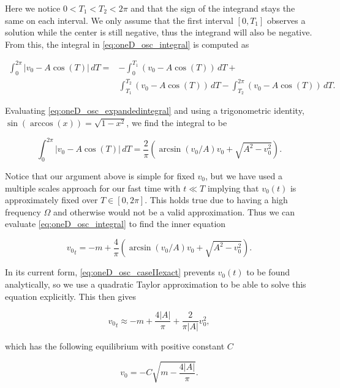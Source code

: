 Here we notice $0<T_1<T_2<2\pi$ and that the sign of the integrand stays the same on each interval. We only assume that the first interval $[0,T_1]$  observes a solution while the center is still negative, thus the integrand will also be negative. From this, the integral in \eqref{eq:oneD_osc_integral} is computed as

\begin{equation}\label{eq:oneD_osc_expandedintegral}
\begin{aligned}
\int_0^{2\pi}|v_0-A\cos(T)|\,dT=&-\int_0^{T_1}(v_0-A\cos(T))\,dT+\\
&\int_{T_1}^{T_2}(v_0-A\cos(T))\,dT-\int_{T_2}^{2\pi}(v_0-A\cos(T))\,dT.
\end{aligned}
\end{equation}

Evaluating \eqref{eq:oneD_osc_expandedintegral} and using a trigonometric identity, $\sin(\arccos(x))=\sqrt{1-x^2}$, we find the integral to be

\begin{equation*}
\int_0^{2\pi}|v_0-A\cos(T)|\,dT=\frac{2}{\pi}\left(\arcsin(v_0/A)v_0+\sqrt{A^2-v_0^2}\right).
\end{equation*}

Notice that our argument above is simple for fixed $v_0$, but we have used a multiple scales approach for our fast time with $t\ll T$ implying that $v_0(t)$ is approximately fixed over $T\in [0,2\pi]$. This holds true due to having a high frequency $\Omega$ and otherwise would not be a valid approximation. Thus we can evaluate \eqref{eq:oneD_osc_integral} to find the inner equation 

\begin{equation}\label{eq:oneD_osc_caseIIexact}
{v_0}_t=-m+\frac{4}{\pi}\left(\arcsin(v_0/A)v_0+\sqrt{A^2-v_0^2}\right).
\end{equation}

\indent In its current form, \eqref{eq:oneD_osc_caseIIexact} prevents $v_0(t)$ to be found analytically, so we use a quadratic Taylor approximation to be able to solve this equation explicitly. This then gives

\begin{equation}\label{eq:oneD_osc_caseIItaylor}
{v_0}_t \approx -m + \frac{4|A|}{\pi} + \frac{2}{\pi |A|}v_0^2,
\end{equation}

which has the following equilibrium with positive constant $C$

\begin{equation}\label{eq:oneD_osc_caseIIequil}
v_0=-C\sqrt{m-\frac{4|A|}{\pi}}.
\end{equation}

